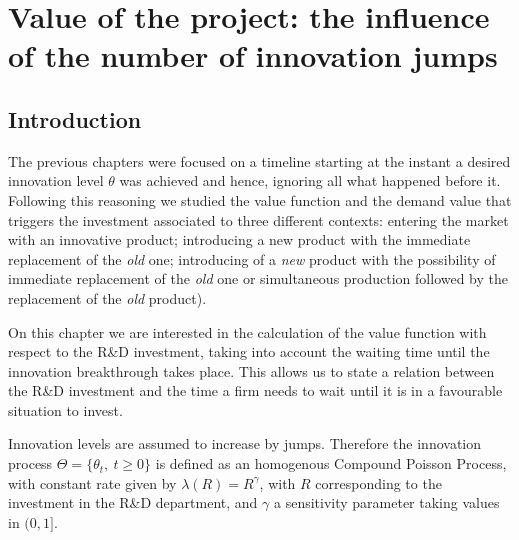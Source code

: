 \chapter{Value of the project: the influence of the number of innovation jumps}
\label{chapter:max}



\section{Introduction}
\label{section:max_intro}

The previous chapters were focused on a timeline starting at the instant a desired innovation level $\theta$ was achieved and hence, ignoring all what happened before it. Following this reasoning we 
studied the value function and the demand value that triggers the investment associated to three different contexts: entering the market with an innovative product; introducing a new product with the immediate replacement of the \textit{old} one; introducing of a \textit{new} product with the possibility of immediate replacement of the \textit{old} one or simultaneous production followed by the replacement of the \textit{old} product).

On this chapter we are interested
in the calculation of the value function with respect to the R\&D investment, taking into account the waiting time until the innovation breakthrough takes place.
This allows us to state a relation between the R\&D investment and the time a firm needs to wait until it is in a favourable situation to invest.



Innovation levels are assumed to increase by jumps. Therefore the innovation process
$\Theta=\{ \theta_t, \ t \geq 0 \}$ is defined as an homogenous Compound Poisson Process, with constant rate given by $\lambda(R)=R^\gamma$, with $R$ corresponding to the investment in the R\&D department, and $\gamma$ a sensitivity parameter taking values in $(0,1]$.

